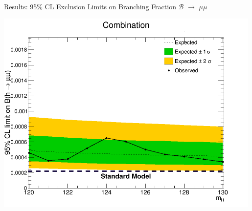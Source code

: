 \documentclass[pdf, 9pt]{beamer}
\begin{document}
  \begin{frame}{Results: 95\% CL Exclusion Limits on Branching Fraction $\mathcal{B}$ $\rightarrow$ $\mu\mu$}
    \begin{center}
      \vspace{-0.3cm}
      \includegraphics[width=0.99\textwidth, height=0.99\textheight]{figs/higgs/limits/bdt_110to160_withSys_limits_1906/limitsOnBRByCategory__combTotal__TripleGaus.png}
    \end{center}
  \end{frame}

  { %
    \begin{frame}[plain]
     \end{frame}
}
\end{document}

